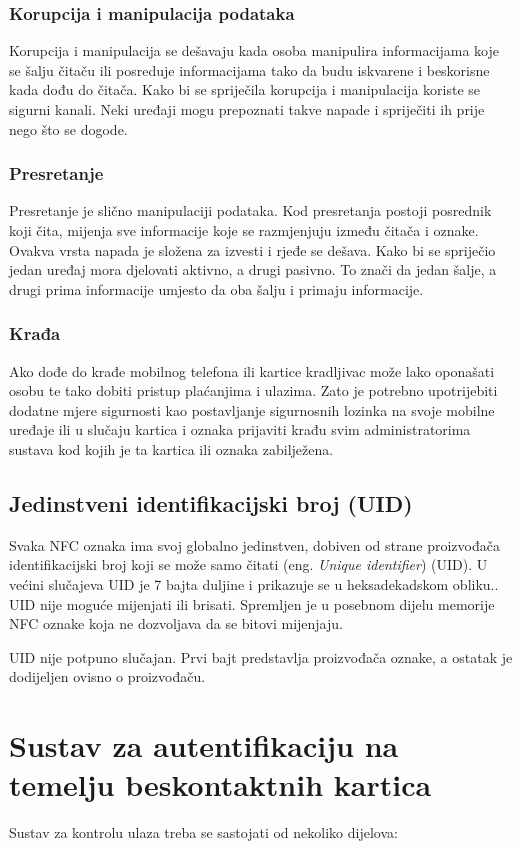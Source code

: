 \documentclass[times, utf8, zavrsni]{fer}
\begin{document}
\subsection{Korupcija i manipulacija podataka}
Korupcija i manipulacija se dešavaju kada osoba manipulira informacijama koje se šalju čitaču ili posreduje informacijama tako da budu iskvarene i beskorisne kada dođu do čitača. Kako bi se spriječila korupcija i manipulacija koriste se sigurni kanali. Neki uređaji mogu prepoznati takve napade i spriječiti ih prije nego što se dogode.
\subsection{Presretanje}
Presretanje je slično manipulaciji podataka. Kod presretanja postoji posrednik koji čita, mijenja sve informacije koje se razmjenjuju između čitača i oznake. Ovakva vrsta napada je složena za izvesti i rjeđe se dešava. Kako bi se spriječio jedan uređaj mora djelovati aktivno, a drugi pasivno. To znači da jedan šalje, a drugi prima informacije umjesto da oba šalju i primaju informacije.
\subsection{Krađa}
Ako dođe do krađe mobilnog telefona ili kartice kradljivac može lako oponašati osobu te tako dobiti pristup plaćanjima i ulazima. Zato je potrebno upotrijebiti dodatne mjere sigurnosti kao postavljanje sigurnosnih lozinka na svoje mobilne uređaje ili u slučaju kartica i oznaka prijaviti krađu svim administratorima sustava kod kojih je ta kartica ili oznaka zabilježena. \citep{6}

\section{Jedinstveni identifikacijski broj (UID)}
Svaka NFC oznaka ima svoj globalno jedinstven, dobiven od strane proizvođača identifikacijski broj koji se može samo čitati (eng. \textit{Unique identifier}) (UID). U većini slučajeva UID je 7 bajta duljine i prikazuje se u heksadekadskom obliku.. UID nije moguće mijenjati ili brisati. Spremljen je u posebnom dijelu memorije NFC oznake koja ne dozvoljava da se bitovi mijenjaju. \par 
UID nije potpuno slučajan. Prvi bajt predstavlja proizvođača oznake, a ostatak je dodijeljen ovisno o proizvođaču.
\citep{7}

\chapter{Sustav za autentifikaciju na temelju beskontaktnih kartica}
Sustav za kontrolu ulaza treba se sastojati od nekoliko dijelova:
\end{document}

